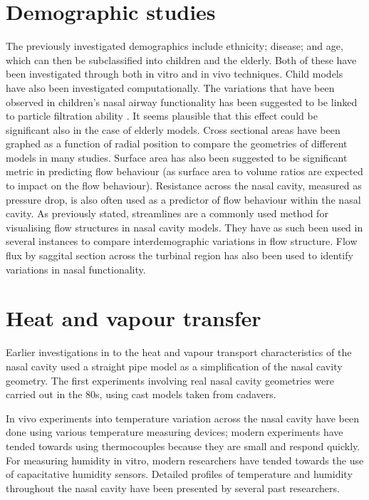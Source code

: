 \section{Demographic studies}
The previously investigated demographics include ethnicity\cite{Zhu2011}; disease\cite{Garcia2007}; and  age\cite{Xi2012}, which can then be subclassified into children\cite{Xi2012} and the elderly\cite{Lindemann2008}. Both of these have been investigated through both in vitro\cite{Weinhold2004} and in vivo\cite{Kalmovich2005, Edelstein1996, WhanKim2007, Lindemann2008} techniques. Child models have also been investigated computationally\cite{Xi2012}. The variations that have been observed in children's nasal airway functionality has been suggested to be linked to particle filtration ability \cite{Xi2012}. It seems plausible that this effect could be significant also in the case of elderly models. Cross sectional areas have been graphed as a function of radial position to compare the geometries of different models in many studies\cite{Xi2012, Zhu2011, Lindemann2008, Garcia2007}. Surface area has also been suggested to be significant metric in predicting flow behaviour (as surface area to volume ratios are expected to impact on the flow behaviour\cite{Xi2012, Garcia2007}). Resistance across the nasal cavity, measured as pressure drop, is also often used as a predictor of flow behaviour within the nasal cavity\cite{Edelstein1996, Lindemann2008, WhanKim2007}. As previously stated, streamlines are a commonly used method for visualising flow structures in nasal cavity models. They have as such been used in several instances to compare interdemographic variations in flow structure\cite{Xi2012, Garcia2007, Zhu2011}. Flow flux by saggital section across the turbinal region has also been used to identify variations in nasal functionality\cite{Zhu2011}. 


\section{Heat and vapour transfer}

Earlier investigations in to the heat and vapour transport characteristics of the nasal cavity used a straight pipe model as a simplification of the nasal cavity geometry\cite{Ingelstedt1961}. The first experiments involving real nasal cavity geometries were carried out in the 80s, using cast models taken from cadavers\cite{Nuckols1983}.

In vivo experiments into temperature variation across the nasal cavity have been done using various temperature measuring devices; modern experiments have tended towards using thermocouples because they are small and respond quickly\cite{Elad2008}. For measuring humidity in vitro, modern researchers have tended towards the use of capacitative humidity sensors\cite{Keck2000}. Detailed profiles of temperature and humidity throughout the nasal cavity have been presented by several past researchers\cite{Keck2000}.

